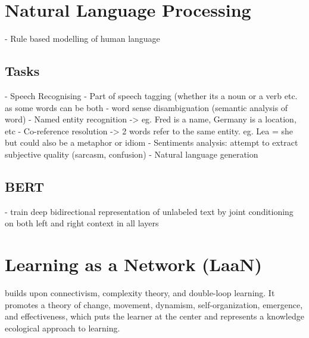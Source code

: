 \documentclass{report}
\begin{document}
\chapter{Natural Language Processing}
- Rule based modelling of human language
\section{Tasks}
- Speech Recognising
- Part of speech tagging (whether its a noun or a verb etc. as some words can be both
- word sense disambiguation (semantic analysis of word)
- Named entity recognition -> eg. Fred is a name, Germany is a location, etc
- Co-reference resolution -> 2 words refer to the same entity. eg. Lea = she but could also be a metaphor or idiom
- Sentiments analysis: attempt to extract subjective quality (sarcasm, confusion)
- Natural language generation

\section{BERT}
- train deep bidirectional representation of unlabeled text by joint conditioning on both left and right context in all layers

\chapter{Learning as a Network (LaaN)}
builds upon connectivism, complexity theory, and double-loop learning. It promotes a theory of change, movement, dynamism, self-organization, emergence, and effectiveness, which puts the learner at the center and represents a knowledge ecological approach to learning. 
\end{document}
